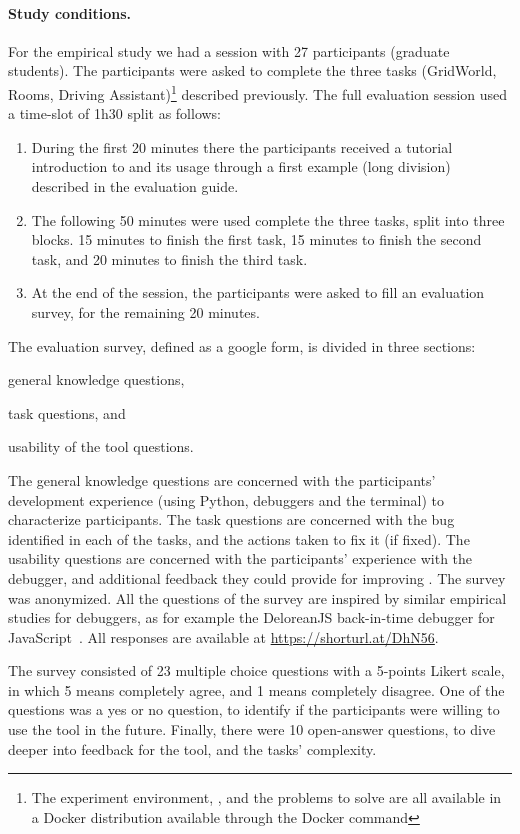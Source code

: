 \paragraph{\textbf{Study conditions.}}
For the empirical study we had a session with 27 participants (\ie graduate students). 
The participants were asked to complete the three tasks (\ie GridWorld, Rooms, Driving Assistant)\footnote{The experiment environment, \flik, and the problems to solve are all available in a Docker distribution available through the Docker command } 
described previously. The full evaluation session used a time-slot of 1h30 split as follows: 
\begin{enumerate}[label=\textbf{\arabic*.}]
  \item During the first 20 minutes there the participants received a tutorial introduction to \flik and its 
  usage through a first example (long division) described in the evaluation guide.
  \item The following 50 minutes were used complete the three tasks, split into three blocks. 15 minutes 
  to finish the first task, 15 minutes to finish the second task, and  20 minutes to finish the third task. 
  \item At the end of the session, the participants were asked to fill an evaluation survey, for the 
  remaining 20 minutes. 
\end{enumerate}

The evaluation survey, defined as a google form, is divided in three sections: 
\begin{enumerate*}[label=(\arabic*)]
\item general knowledge questions, 
\item task questions, and 
\item usability of the tool questions.
\end{enumerate*}
The general knowledge questions are concerned with the participants' development experience 
(\ie using Python, debuggers and the terminal) to characterize participants. The task questions are 
concerned with the bug identified in each of the tasks, and the actions taken to fix it (if fixed). The 
usability questions are concerned with the participants' experience with the debugger, and additional 
feedback they could provide for improving \flik. The survey was anonymized. All the questions of the 
survey are inspired by similar empirical studies for debuggers, as for example the DeloreanJS 
back-in-time debugger for JavaScript~\cite{leger23}. All responses are available 
at \url{https://shorturl.at/DhN56}. 

The survey consisted of 23 multiple choice questions with a 5-points Likert scale, in which 5 means 
completely agree, and 1 means completely disagree. One of the questions was a yes or no question, 
to identify if the participants were willing to use the tool in the future. Finally, there were 10 open-answer 
questions, to dive deeper into feedback for the tool, and the tasks' complexity.


\endinput

